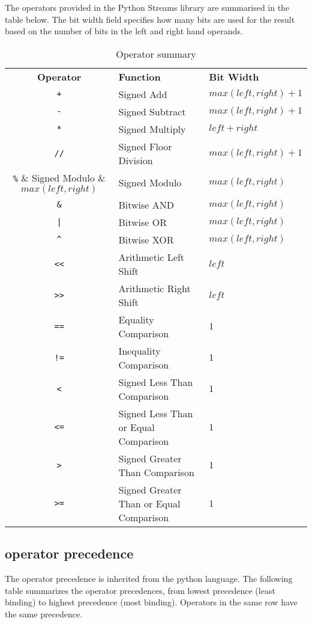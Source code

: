 The operators provided in the Python Streams library are summarised in the table
below. The bit width field specifies how many bits are used for the result
based on the number of bits in the left and right hand operands.

\begin{table}[h]
\begin{center}
\begin{tabular}[]{cll}
\textbf{Operator} & \textbf{Function}            & \textbf{Bit Width}\\
\verb$+$          & Signed Add                   & $max(left, right) + 1$\\
\verb$-$          & Signed Subtract              & $max(left, right) + 1$\\
\verb$*$          & Signed Multiply              & $left + right$\\
\verb$//$         & Signed Floor Division        & $max(left, right) + 1$\\
\verb$%$          & Signed Modulo                & $max(left, right)$\\
\verb$&$          & Bitwise AND                  & $max(left, right)$\\
\verb$|$          & Bitwise OR                   & $max(left, right)$\\
\verb$^$          & Bitwise XOR                  & $max(left, right)$\\
\verb$<<$         & Arithmetic Left Shift                   & $left$\\
\verb$>>$         & Arithmetic Right Shift                  & $left$\\
\verb$==$         & Equality Comparison                     & $1$\\
\verb$!=$         & Inequality Comparison                   & $1$\\
\verb$<$          & Signed Less Than Comparison             & $1$\\
\verb$<=$         & Signed Less Than or Equal Comparison    & $1$\\
\verb$>$          & Signed Greater Than Comparison          & $1$\\
\verb$>=$         & Signed Greater Than or Equal Comparison & $1$\\
\end{tabular}
\end{center}
\caption{Operator summary}
\end{table}

\subsection{operator precedence}
The operator precedence is inherited from the python language. The following
table summarizes the operator precedences, from lowest precedence (least
binding) to highest precedence (most binding). Operators in the same row have
the same precedence.

